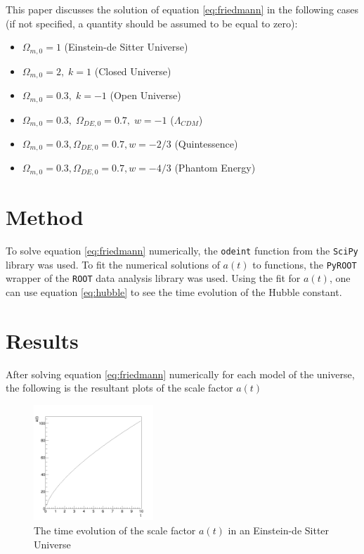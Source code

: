 \documentclass[aps,reprint,prl]{revtex4-1}
\begin{document}
This paper discusses the solution of equation \ref{eq:friedmann} in the following cases (if not specified, a quantity should be assumed to be equal to zero):
\begin{itemize}
\item $\Omega_{m,0}=1$ (Einstein-de Sitter Universe)
\item $\Omega_{m,0}=2,\;k=1$ (Closed Universe)
\item $\Omega_{m,0}=0.3,\;k=-1$ (Open Universe)
\item $\Omega_{m,0}=0.3,\;\Omega_{DE,0}=0.7,\;w=-1$ ($\Lambda_{CDM}$)
\item $\Omega_{m,0}=0.3,\Omega_{DE,0}=0.7,w=-2/3$ (Quintessence)
\item $\Omega_{m,0}=0.3,\Omega_{DE,0}=0.7,w=-4/3$ (Phantom Energy)
\end{itemize}
\section*{Method}
To solve equation \ref{eq:friedmann} numerically, the \texttt{odeint} function from the \texttt{SciPy} library \cite{scipy} was used.  To fit the numerical solutions of $a(t)$ to functions, the \texttt{PyROOT} wrapper of the \texttt{ROOT} data analysis library \cite{ROOT} was used.  Using the fit for $a(t)$, one can use equation \ref{eq:hubble} to see the time evolution of the Hubble constant.
\section*{Results}
After solving equation \ref{eq:friedmann} numerically for each model of the universe, the following is the resultant plots of the scale factor $a(t)$

\begin{figure}[H!]
\includegraphics[width=0.4\textwidth]{ps1_plots/a_einstein}
\caption{The time evolution of the scale factor $a(t)$ in an Einstein-de Sitter Universe}
\end{figure}
\end{document}
